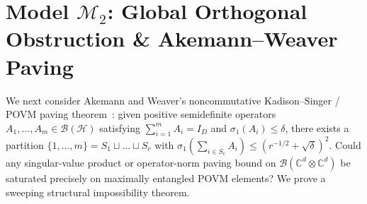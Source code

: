 \documentclass[11pt,a4paper]{article}
\theoremstyle{plain}
\theoremstyle{definition}
\newcommand{\C}{\mathbb{C}}
\newcommand{\cH}{\mathcal{H}}
\newcommand{\cB}{\mathcal{B}}
\begin{document}
\section{Model \texorpdfstring{$\mathcal{M}_2$}{M2}: Global Orthogonal Obstruction \& Akemann--Weaver Paving}

We next consider Akemann and Weaver's noncommutative Kadison--Singer / POVM paving theorem~\cite{AkemannWeaver2014,MSS2015}: given positive semidefinite operators $A_1, \dots, A_m \in \cB(\cH)$ satisfying $\sum_{i=1}^m A_i = I_D$ and $\sigma_1(A_i) \le \delta$, there exists a partition $\{1,\dots,m\} = S_1 \sqcup \dots \sqcup S_r$ with $\sigma_1(\sum_{i \in S_c} A_i) \le (r^{-1/2} + \sqrt{\delta})^2$. Could any singular-value product or operator-norm paving bound on $\cB(\C^d \otimes \C^d)$ be saturated precisely on maximally entangled POVM elements? We prove a sweeping structural impossibility theorem.
\end{document}

